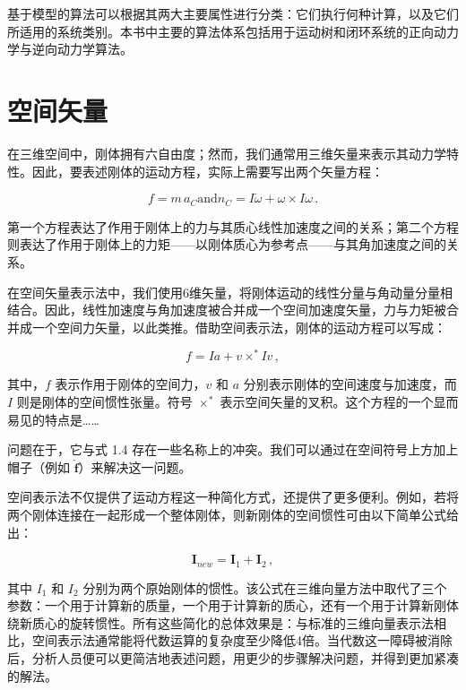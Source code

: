 \documentclass[10pt,a4paper]{book}
\theoremstyle{thmstyle} %
\theoremstyle{defstyle} %
\theoremstyle{prostyle} %
\begin{document}
基于模型的算法可以根据其两大主要属性进行分类：它们执行何种计算，以及它们所适用的系统类别。本书中主要的算法体系包括用于运动树和闭环系统的正向动力学与逆向动力学算法。



\section{空间矢量}





在三维空间中，刚体拥有六自由度；然而，我们通常用三维矢量来表示其动力学特性。因此，要表述刚体的运动方程，实际上需要写出两个矢量方程：



$$
f = m \, a _ { C }  \mathrm { a n d }  n _ { C } = I \dot { \omega } + \omega \times I \omega \, .
$$  



第一个方程表达了作用于刚体上的力与其质心线性加速度之间的关系；第二个方程则表达了作用于刚体上的力矩——以刚体质心为参考点——与其角加速度之间的关系。



在空间矢量表示法中，我们使用6维矢量，将刚体运动的线性分量与角动量分量相结合。因此，线性加速度与角加速度被合并成一个空间加速度矢量，力与力矩被合并成一个空间力矢量，以此类推。借助空间表示法，刚体的运动方程可以写成：



$$
f = I a + v \times ^{*} I v \, ,
$$  



其中，$f$ 表示作用于刚体的空间力，$v$ 和 $a$ 分别表示刚体的空间速度与加速度，而 $I$ 则是刚体的空间惯性张量。符号 $\times^{*}$ 表示空间矢量的叉积。这个方程的一个显而易见的特点是……



问题在于，它与式 1.4 存在一些名称上的冲突。我们可以通过在空间符号上方加上帽子（例如 $\hat{\boldsymbol{f}}$）来解决这一问题。



空间表示法不仅提供了运动方程这一种简化方式，还提供了更多便利。例如，若将两个刚体连接在一起形成一个整体刚体，则新刚体的空间惯性可由以下简单公式给出：



$$
{ \boldsymbol { I } } _ { n e w } = { \boldsymbol { I } } _ { 1 } + { \boldsymbol { I } } _ { 2 } \, ,
$$



其中 $I_{1}$ 和 $I_{2}$ 分别为两个原始刚体的惯性。该公式在三维向量方法中取代了三个参数：一个用于计算新的质量，一个用于计算新的质心，还有一个用于计算新刚体绕新质心的旋转惯性。所有这些简化的总体效果是：与标准的三维向量表示法相比，空间表示法通常能将代数运算的复杂度至少降低4倍。当代数这一障碍被消除后，分析人员便可以更简洁地表述问题，用更少的步骤解决问题，并得到更加紧凑的解法。
\end{document}
